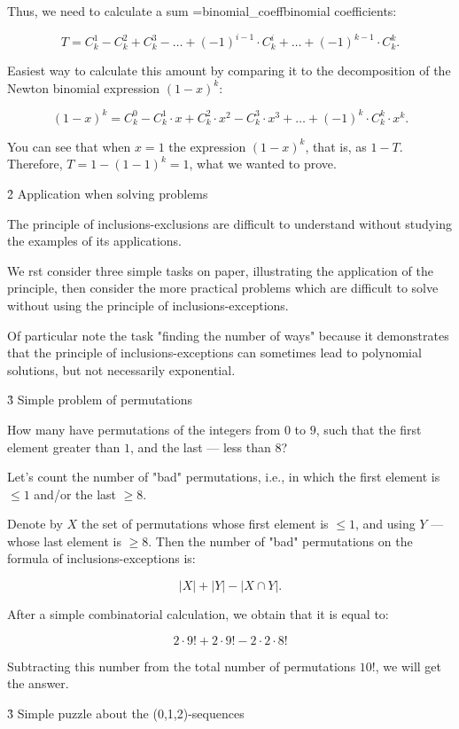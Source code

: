 Thus, we need to calculate a sum \algohref=binomial_coeff{binomial coefficients}:

$$ T = C_k^1 - C_k^2 + C_k^3 - \ldots + (-1)^{i-1} \cdot C_k^i + \ldots + (-1)^{k-1} \cdot C_k^k. $$

Easiest way to calculate this amount by comparing it to the decomposition of the Newton binomial expression $(1-x)^k$:

$$ (1-x)^k = C_k^0 - C_k^1 \cdot x + C_k^2 \cdot x^2 - C_k^3 \cdot x^3 + \ldots + (-1)^k \cdot C_k^k \cdot x^k. $$

You can see that when $x=1$ the expression $(1-x)^k$, that is, as $1 - T$. Therefore, $T = 1 - (1-1)^k = 1$, what we wanted to prove.


\h2{ Application when solving problems }

The principle of inclusions-exclusions are difficult to understand without studying the examples of its applications.

We rst consider three simple tasks on paper, illustrating the application of the principle, then consider the more practical problems which are difficult to solve without using the principle of inclusions-exceptions.

Of particular note the task "finding the number of ways" because it demonstrates that the principle of inclusions-exceptions can sometimes lead to polynomial solutions, but not necessarily exponential.


\h3{ Simple problem of permutations }

How many have permutations of the integers from $0$ to $9$, such that the first element greater than $1$, and the last --- less than $8$?

Let's count the number of "bad" permutations, i.e., in which the first element is $\le 1$ and/or the last $\ge 8$.

Denote by $X$ the set of permutations whose first element is $\le 1$, and using $Y$ --- whose last element is $\ge 8$. Then the number of "bad" permutations on the formula of inclusions-exceptions is:

$$ |X| + |Y| - |X \cap Y|. $$

After a simple combinatorial calculation, we obtain that it is equal to:

$$ 2 \cdot 9! + 2 \cdot 9! - 2 \cdot 2 \cdot 8! $$

Subtracting this number from the total number of permutations $10!$, we will get the answer.


\h3{ Simple puzzle about the (0,1,2)-sequences }

